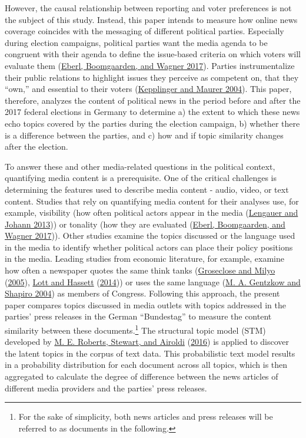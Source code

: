 \documentclass[
]{article}
\begin{document}
However, the causal relationship between reporting and voter preferences
is not the subject of this study. Instead, this paper intends to measure
how online news coverage coincides with the messaging of different
political parties. Especially during election campaigns, political
parties want the media agenda to be congruent with their agenda to
define the issue-based criteria on which voters will evaluate them
(\protect\hyperlink{ref-eberl_one_2017}{Eberl, Boomgaarden, and Wagner
2017}). Parties instrumentalize their public relations to highlight
issues they perceive as competent on, that they ``own,'' and essential
to their voters
(\protect\hyperlink{ref-kepplinger_einfluss_2004}{Kepplinger and Maurer
2004}). This paper, therefore, analyzes the content of political news in
the period before and after the 2017 federal elections in Germany to
determine a) the extent to which these news echo topics covered by the
parties during the election campaign, b) whether there is a difference
between the parties, and c) how and if topic similarity changes after
the election.

To answer these and other media-related questions in the political
context, quantifying media content is a prerequisite. One of the
critical challenges is determining the features used to describe media
content - audio, video, or text content. Studies that rely on
quantifying media content for their analyses use, for example,
visibility (how often political actors appear in the media
(\protect\hyperlink{ref-lengauer_candidate_2013}{Lengauer and Johann
2013})) or tonality (how they are evaluated
(\protect\hyperlink{ref-eberl_one_2017}{Eberl, Boomgaarden, and Wagner
2017})). Other studies examine the topics discussed or the language used
in the media to identify whether political actors can place their policy
positions in the media. Leading studies from economic literature, for
example, examine how often a newspaper quotes the same think tanks
(\protect\hyperlink{ref-groseclose_measure_2005}{Groseclose and Milyo}
(\protect\hyperlink{ref-groseclose_measure_2005}{2005}),
\protect\hyperlink{ref-lott_is_2014}{Lott and Hassett}
(\protect\hyperlink{ref-lott_is_2014}{2014})) or uses the same language
(\protect\hyperlink{ref-gentzkow_media_2004}{M. A. Gentzkow and Shapiro
2004}) as members of Congress. Following this approach, the present
paper compares topics discussed in media outlets with topics addressed
in the parties' press releases in the German ``Bundestag'' to measure
the content similarity between these documents.\footnote{For the sake of
  simplicity, both news articles and press releases will be referred to
  as documents in the following.} The structural topic model (STM)
developed by \protect\hyperlink{ref-roberts_model_2016}{M. E. Roberts,
Stewart, and Airoldi} (\protect\hyperlink{ref-roberts_model_2016}{2016})
is applied to discover the latent topics in the corpus of text data.
This probabilistic text model results in a probability distribution for
each document across all topics, which is then aggregated to calculate
the degree of difference between the news articles of different media
providers and the parties' press releases.
\end{document}
